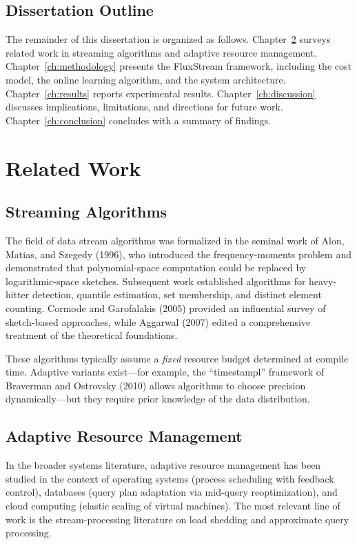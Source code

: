 \documentclass[
    language=english,
    doctype=dissertation,
    institution=none,
    titlestyle=book,
]{../../omnilatex}
\begin{document}
\section{Dissertation Outline}

The remainder of this dissertation is organized as follows. Chapter~\ref{ch:related} surveys related work in streaming algorithms and adaptive resource management. Chapter~\ref{ch:methodology} presents the FluxStream framework, including the cost model, the online learning algorithm, and the system architecture. Chapter~\ref{ch:results} reports experimental results. Chapter~\ref{ch:discussion} discusses implications, limitations, and directions for future work. Chapter~\ref{ch:conclusion} concludes with a summary of findings.

\chapter{Related Work}\label{ch:related}

\section{Streaming Algorithms}

The field of data stream algorithms was formalized in the seminal work of Alon, Matias, and Szegedy (1996), who introduced the frequency-moments problem and demonstrated that polynomial-space computation could be replaced by logarithmic-space sketches. Subsequent work established algorithms for heavy-hitter detection, quantile estimation, set membership, and distinct element counting. Cormode and Garofalakis (2005) provided an influential survey of sketch-based approaches, while Aggarwal (2007) edited a comprehensive treatment of the theoretical foundations.

These algorithms typically assume a \emph{fixed} resource budget determined at compile time. Adaptive variants exist---for example, the ``timestampl'' framework of Braverman and Ostrovsky (2010) allows algorithms to choose precision dynamically---but they require prior knowledge of the data distribution.

\section{Adaptive Resource Management}

In the broader systems literature, adaptive resource management has been studied in the context of operating systems (process scheduling with feedback control), databases (query plan adaptation via mid-query reoptimization), and cloud computing (elastic scaling of virtual machines). The most relevant line of work is the stream-processing literature on load shedding and approximate query processing.
\end{document}
